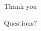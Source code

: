 \documentclass[aspectratio=169]{beamer}
\begin{document}
\begin{frame}[plain]
  \begin{center}
    {\Huge Thank you}

    \bigskip
    {\Large Questions?}
  \end{center}
\end{frame}
\end{document}

